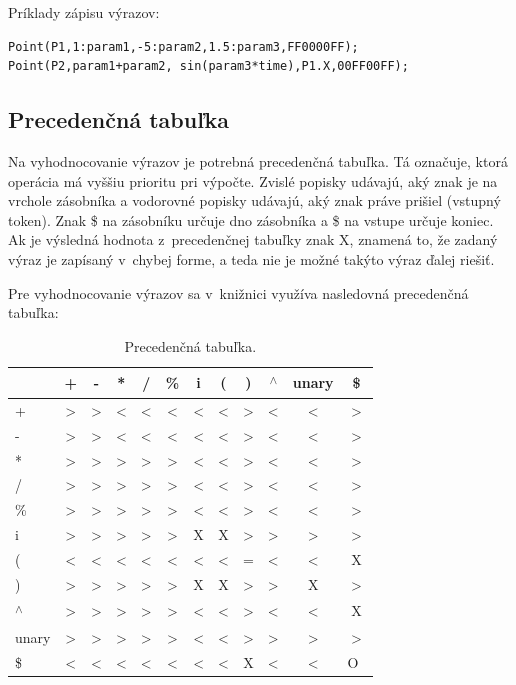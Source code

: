 Príklady zápisu výrazov:


\lstset {language=C++}
\begin{lstlisting}
Point(P1,1:param1,-5:param2,1.5:param3,FF0000FF);
Point(P2,param1+param2, sin(param3*time),P1.X,00FF00FF); 
\end{lstlisting}


\subsection*{Precedenčná tabuľka}
Na vyhodnocovanie výrazov je potrebná precedenčná tabuľka. Tá označuje, ktorá operácia má vyššiu prioritu pri výpočte. Zvislé popisky udávajú, aký znak je na vrchole zásobníka a vodorovné popisky udávajú, aký znak práve prišiel (vstupný token). Znak \$ na zásobníku určuje dno zásobníka a \$ na vstupe určuje koniec. Ak je výsledná hodnota z~precedenčnej tabuľky znak X, znamená to, že zadaný výraz je zapísaný v~chybej forme, a teda nie je možné takýto výraz ďalej riešiť.

Pre vyhodnocovanie výrazov sa v~knižnici využíva nasledovná precedenčná tabuľka: 
\begin{table}[H]
\centering
\begin{tabular}{ |m{1cm}||c c c c c c c c c c c |}
\hline
&+ & - & * & / & \% & i & ( & ) & \textsuperscript{$\wedge$} & unary & \$   \\
\hline
\hline
+ & > & > & < & < & < & < & < & > & < & < & >          \\
- & > & > & < & < & < & < & < & > & < & < & >          \\
* & > & > & > & > & > & < & < & > & < & < & >          \\
/ & > & > & > & > & > & < & < & > & < & < & >          \\
\% & > & > & > & > & > & < & < & > & < & < & >          \\
i & > & > & > & > & > & X & X & > & > & > & >          \\
( & < & < & < & < & < & < & < & = & < & < & X          \\
) & > & > & > & > & > & X & X & > & > & X & >          \\
\textsuperscript{$\wedge$} & > & > & > & > & > & < & < & > & < & < & X \\
unary & > & > & > & > & > & < & < & > & > & > & >      \\
\$ & < & < & < & < & < & < & < & X & < & < & O~\\
\hline
\end{tabular}
\caption{\label{tab:precedenceTable}Precedenčná tabuľka.}
\end{table}


